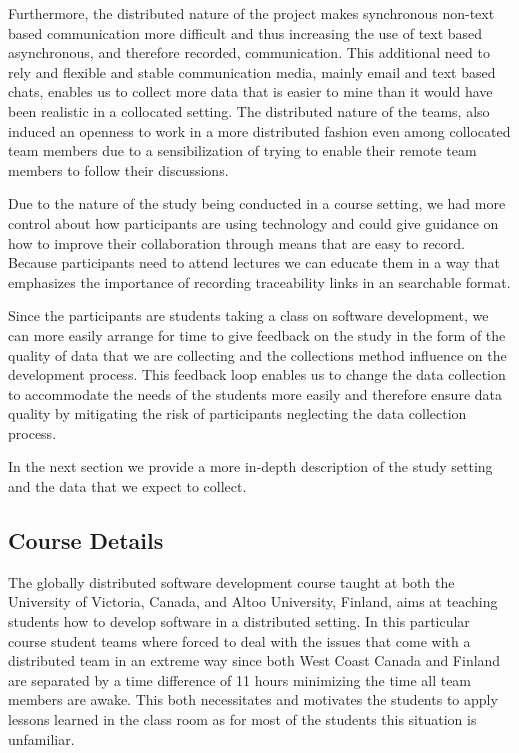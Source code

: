 Furthermore, the distributed nature of the project makes synchronous non-text based communication more difficult and thus increasing the use of text based asynchronous, and therefore recorded, communication.
This additional need to rely and flexible and stable communication media, mainly email and text based chats, enables us to collect more data that is easier to mine than it would have been realistic in a collocated setting.
The distributed nature of the teams, also induced an openness to work in a more distributed fashion even among collocated team members due to a sensibilization of trying to enable their remote team members to follow their discussions.

Due to the nature of the study being conducted in a course setting, we had more control about how participants are using technology and could give guidance on how to improve their collaboration through means that are easy to record.
Because participants need to attend lectures we can educate them in a way that emphasizes the importance of recording traceability links in an searchable format.

Since the participants are students taking a class on software development, we can more easily arrange for time to give feedback on the study in the form of the quality of data that we are collecting and the collections method influence on the development process.
This feedback loop enables us to change the data collection to accommodate the needs of the students more easily and therefore ensure data quality by mitigating the risk of participants neglecting the data collection process. 

In the next section we provide a more in-depth description of the study setting and the data that we expect to collect.

\subsection{Course Details}
The globally distributed software development course taught at both the University of Victoria, Canada, and Altoo University, Finland, aims at teaching students how to develop software in a distributed setting.
In this particular course student teams where forced to deal with the issues that come with a distributed team in an extreme way since both West Coast Canada and Finland are separated by a time difference of 11 hours minimizing the time all team members are awake.
This both necessitates and motivates the students to apply lessons learned in the class room as for most of the students this situation is unfamiliar.

